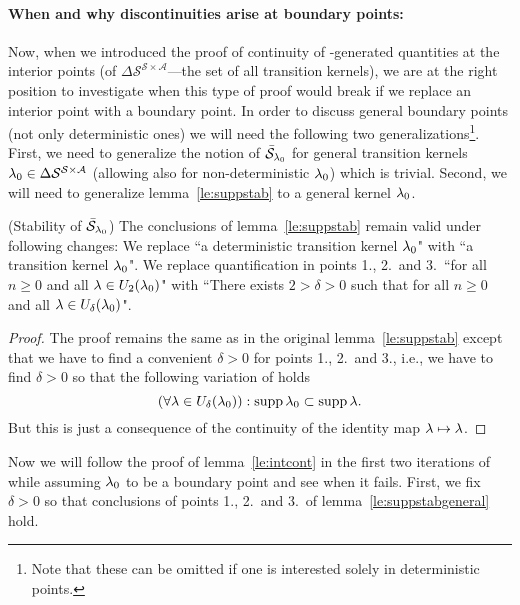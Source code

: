 \paragraph{When and why discontinuities arise at boundary points:}
Now, when we introduced the proof of continuity of \eUDRL{}-generated
quantities at the interior points (of $\Delta\mathcal{S}^{\mathcal{S}\times\mathcal{A}}$---the set of all transition kernels), we are at the right position
to investigate when this type of proof would break if we replace
an interior point with a boundary point.
In order to discuss general boundary points (not only deterministic ones) we will need the following two generalizations\footnote{Note that these can be omitted if one is interested solely in deterministic points.}. 
First, we need to generalize the notion of $\bar{\mathcal{S}}_{\mathit{\lambda}_0}$ for general transition kernels $\mathit{\lambda}_0\in\Delta\mathcal{S}^{\mathcal{S}\times\mathcal{A}}$ (allowing also for non-deterministic $\mathit{\lambda}_0$) which is trivial. Second, we will need to generalize  lemma~\ref{le:suppstab} to a general kernel $\mathit{\lambda}_0$.

\begin{lemma}\label{le:suppstabgeneral}(Stability of $\bar{\mathcal{S}}_{\mathit{\lambda}_0}$) The conclusions of lemma~\ref{le:suppstab} remain valid under following changes: We replace ``a deterministic transition kernel $\mathit{\lambda}_0$" with ``a transition kernel $\mathit{\lambda}_0$". We replace quantification in points 1., 2.\ and 3.\ ``for all $n\geq0$ and all $\mathit{\lambda}\in U_2(\mathit{\lambda}_0)$" with ``There exists $2> \delta > 0$ such that for all $n\geq0$ and all $\mathit{\lambda}\in U_{\delta}(\mathit{\lambda}_0)$".     
\end{lemma}
\begin{proof}
The proof remains the same as in the original lemma~\ref{le:suppstab} except that we have to find a convenient $\delta>0$ for points 1., 2.\ and 3.,
i.e., we have to find $\delta>0$ so that the following variation of  holds
$$
(\forall \mathit{\lambda} \in U_{\delta}(\mathit{\lambda}_0)) :
\operatorname*{\mathrm{supp}} \mathit{\lambda}_0 \subset \operatorname*{\mathrm{supp}} \mathit{\lambda}.
$$
But this is just a consequence of the continuity of the identity map $\mathit{\lambda} \mapsto \mathit{\lambda}$.
\end{proof}

Now we will follow the proof of lemma~\ref{le:intcont} in the first two iterations of \eUDRL{} while assuming $\mathit{\lambda}_0$ to be a boundary point and see when it fails.
First, we fix $\delta>0$ so that conclusions of points 1., 2.\ and 3.\ of lemma~\ref{le:suppstabgeneral} hold.

